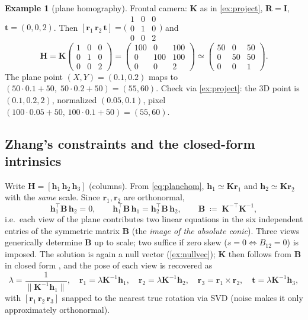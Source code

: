 \documentclass[11pt]{article}
\theoremstyle{definition}
\newtheorem{example}{Example}
\newcommand{\mat}[1]{\mathbf{#1}}
\newcommand{\vect}[1]{\mathbf{#1}}
\newcommand{\R}{\mat{R}}
\newcommand{\K}{\mat{K}}
\newcommand{\B}{\mat{B}}
\newcommand{\Hm}{\mat{H}}
\newcommand{\tv}{\vect{t}}
\begin{document}
\begin{example}[plane homography]
\label{ex:homography}
Frontal camera: $\K$ as in \autoref{ex:project}, $\R=\mat I$,
$\tv=(0,0,2)$. Then $[\vect r_1\,\vect r_2\,\tv]=
\bigl(\begin{smallmatrix}1&0&0\\0&1&0\\0&0&2\end{smallmatrix}\bigr)$ and
\[
\Hm=\K\begin{pmatrix}1&0&0\\0&1&0\\0&0&2\end{pmatrix}
=\begin{pmatrix}100&0&100\\0&100&100\\0&0&2\end{pmatrix}
\simeq\begin{pmatrix}50&0&50\\0&50&50\\0&0&1\end{pmatrix}.
\]
The plane point $(X,Y)=(0.1,0.2)$ maps to
$(50\cdot0.1+50,\;50\cdot0.2+50)=(55,60)$. Check via
\autoref{ex:project}: the 3D point is $(0.1,0.2,2)$, normalized
$(0.05,0.1)$, pixel $(100\cdot0.05+50,\,100\cdot0.1+50)=(55,60)$. \qedhere
\end{example}

\subsection{Zhang's constraints and the closed-form intrinsics}
\label{sec:zhang}

Write $\Hm=[\vect h_1\,\vect h_2\,\vect h_3]$ (columns). From
\eqref{eq:planehom}, $\vect h_1\simeq\K\vect r_1$ and
$\vect h_2\simeq\K\vect r_2$ with the \emph{same} scale. Since
$\vect r_1,\vect r_2$ are orthonormal,
\begin{equation}
\vect h_1^{\!\top}\B\,\vect h_2=0,
\qquad
\vect h_1^{\!\top}\B\,\vect h_1=\vect h_2^{\!\top}\B\,\vect h_2,
\qquad
\B \;\coloneqq\; \K^{-\!\top}\K^{-1},
\label{eq:zhangconstraints}
\end{equation}
i.e.\ each view of the plane contributes two linear equations in the six
independent entries of the symmetric matrix $\B$ (the \emph{image of the
absolute conic}). Three views generically determine $\B$ up to scale; two
suffice if zero skew ($s{=}0 \Leftrightarrow B_{12}{=}0$) is imposed. The
solution is again a null vector (\autoref{ex:nullvec}); $\K$ then follows
from $\B$ in closed form \cite{Zhang2000}, and the pose of each view is
recovered as
\begin{equation}
\lambda=\frac1{\|\K^{-1}\vect h_1\|},\quad
\vect r_1=\lambda\K^{-1}\vect h_1,\quad
\vect r_2=\lambda\K^{-1}\vect h_2,\quad
\vect r_3=\vect r_1\times\vect r_2,\quad
\tv=\lambda\K^{-1}\vect h_3,
\label{eq:extrinsics}
\end{equation}
with $[\vect r_1\,\vect r_2\,\vect r_3]$ snapped to the nearest true
rotation via SVD (noise makes it only approximately orthonormal).
\end{document}
